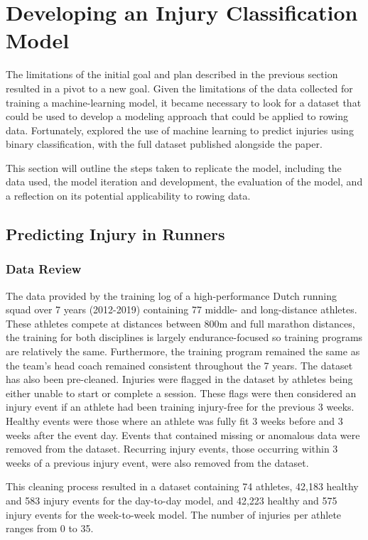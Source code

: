 \section{Developing an Injury Classification Model}
The limitations of the initial goal and plan described in the previous section resulted in a pivot to a new goal. Given the limitations of the data collected for training a machine-learning model, it became necessary to look for a dataset that could be used to develop a modeling approach that could be applied to rowing data. Fortunately, \textcite{Lovdal2021} explored the use of machine learning to predict injuries using binary classification, with the full dataset published alongside the paper. 

This section will outline the steps taken to replicate the model, including the data used, the model iteration and development, the evaluation of the model, and a reflection on its potential applicability to rowing data.

\subsection{Predicting Injury in Runners}
\subsubsection{Data Review}
The data provided by \textcite{Lovdal2021} the training log of a high-performance Dutch running squad over 7 years (2012-2019) containing 77 middle- and long-distance athletes. These athletes compete at distances between 800m and full marathon distances, the training for both disciplines is largely endurance-focused so training programs are relatively the same. Furthermore, the training program remained the same as the team's head coach remained consistent throughout the 7 years. The dataset has also been pre-cleaned. Injuries were flagged in the dataset by athletes being either unable to start or complete a session. These flags were then considered an injury event if an athlete had been training injury-free for the previous 3 weeks. Healthy events were those where an athlete was fully fit 3 weeks before and 3 weeks after the event day. Events that contained missing or anomalous data were removed from the dataset. Recurring injury events, those occurring within 3 weeks of a previous injury event, were also removed from the dataset.

This cleaning process resulted in a dataset containing 74 athletes, 42,183 healthy and 583 injury events for the day-to-day model, and 42,223 healthy and 575 injury events for the week-to-week model. The number of injuries per athlete ranges from 0 to 35.

